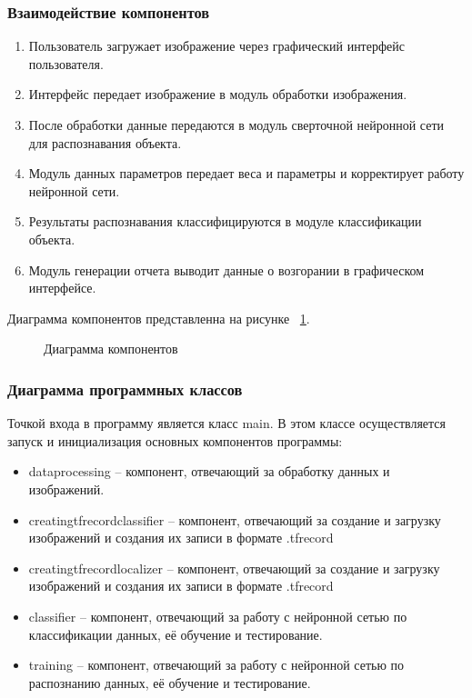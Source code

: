 \subsubsection{Взаимодействие компонентов}

\begin{enumerate}
\item Пользователь загружает изображение через графический интерфейс пользователя.
\item Интерфейс передает изображение в модуль обработки изображения.
\item После обработки данные передаются в модуль сверточной нейронной сети для распознавания объекта.
\item Модуль данных параметров передает веса и параметры и корректирует работу нейронной сети.
\item Результаты распознавания классифицируются в модуле классификации объекта.
\item Модуль генерации отчета выводит данные о возгорании в графическом интерфейсе.
\end{enumerate}

Диаграмма компонентов представленна на рисунке ~\ref{comp:image}.

\begin{figure}[H]
\caption{Диаграмма компонентов}
\label{comp:image}
\end{figure}

\subsubsection{Диаграмма программных классов}

Точкой входа в программу является класс main. В этом классе осуществляется запуск и инициализация основных компонентов программы:
\begin{itemize}
	\item dataprocessing -- компонент, отвечающий за обработку данных и изображений.
	\item creatingtfrecordclassifier -- компонент, отвечающий за создание и загрузку изображений и создания их записи в формате .tfrecord
	\item creatingtfrecordlocalizer -- компонент, отвечающий за создание и загрузку изображений и создания их записи в формате .tfrecord
	\item classifier -- компонент, отвечающий за работу с нейронной сетью по классификации данных, её обучение и тестирование.
	\item training -- компонент, отвечающий за работу с нейронной сетью по распознанию данных, её обучение и тестирование.
\end{itemize}

